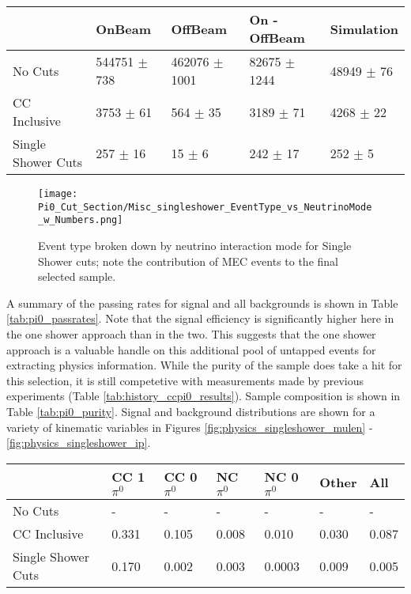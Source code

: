 \begin{table}[H] 
 \centering
 \begin{tabular}{| l | l | l | l | l |}
  \hline
   & OnBeam & OffBeam & On - OffBeam & Simulation \\ [0.1ex] \hline
No Cuts & 544751 $\pm$ 738 & 462076 $\pm$ 1001 & 82675 $\pm$ 1244 & 48949 $\pm$ 76 \\ 
CC Inclusive & 3753 $\pm$ 61 & 564 $\pm$ 35  & 3189 $\pm$ 71 & 4268 $\pm$ 22  \\ 
Single Shower Cuts & 257 $\pm$ 16 & 15 $\pm$ 6 & 242 $\pm$ 17 & 252 $\pm$ 5  \\ \hline
\end{tabular}
 \end{table}


\begin{figure}[H]
\centering
\texttt{[image: Pi0\_Cut\_Section/Misc\_singleshower\_EventType\_vs\_NeutrinoMode\_w\_Numbers.png]}
\caption{ Event type broken down by neutrino interaction mode for Single Shower cuts; note the contribution of MEC events to the final selected sample. }
\label{fig:physics_singleshower_inttype}
\end{figure}


\par A summary of the passing rates for signal and all backgrounds is shown in Table \ref{tab:pi0_passrates}.  Note that the signal efficiency is significantly higher here in the one shower approach than in the two. This suggests that the one shower approach is a valuable handle on this additional pool of untapped events for extracting physics information. While the purity of the sample does take a hit for this selection, it is still competetive with measurements made by previous experiments (Table \ref{tab:history_ccpi0_results}). Sample composition is shown in Table \ref{tab:pi0_purity}.  Signal and background distributions are shown for a variety of kinematic variables in Figures \ref{fig:physics_singleshower_mulen} - \ref{fig:physics_singleshower_ip}.


\begin{table}[H]
\centering
{}
 \begin{tabular}{| l | l | l |l|l|l|l|}
 \hline
 & CC 1$\pi^0$ & CC 0$\pi^0$ & NC $\pi^0$ & NC 0$\pi^0$ & Other & All \\ [0.1ex] \hline
No Cuts & - & - & - & - & - & -\\
CC Inclusive & 0.331 & 0.105 & 0.008 & 0.010 & 0.030 & 0.087 \\ 
Single Shower Cuts & 0.170 & 0.002 & 0.003 & 0.0003 & 0.009 & 0.005 \\ \hline
\end{tabular}
\end{table}

